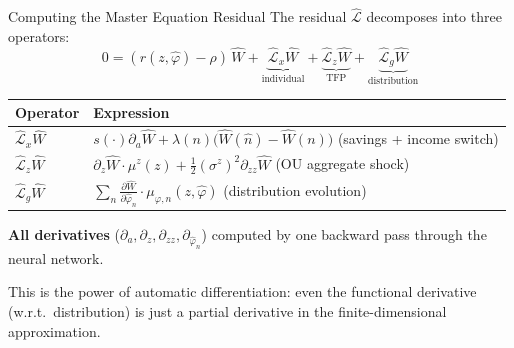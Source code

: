 \documentclass[aspectratio=169,11pt]{beamer}
\newcommand{\emphc}[1]{\textcolor{harvardcrimson}{#1}}
\begin{document}
\begin{frame}{Computing the Master Equation Residual}
\small
The residual $\hat{\mathcal{L}}$ decomposes into three operators:
\[
0 = (r(z,\hat{\varphi}) - \rho)\,\hat{W} + \underbrace{\hat{\mathcal{L}}_x\hat{W}}_{\text{individual}} + \underbrace{\hat{\mathcal{L}}_z\hat{W}}_{\text{TFP}} + \underbrace{\hat{\mathcal{L}}_g\hat{W}}_{\text{distribution}}
\]

\vspace{0.1em}
\begin{center}
\small
\renewcommand{\arraystretch}{1.3}
\begin{tabular}{ll}
\toprule
\textbf{Operator} & \textbf{Expression} \\
\midrule
$\hat{\mathcal{L}}_x\hat{W}$ & $s(\cdot)\partial_a\hat{W} + \lambda(n)\big(\hat{W}(\hat{n}) - \hat{W}(n)\big)$ \quad (savings + income switch) \\
$\hat{\mathcal{L}}_z\hat{W}$ & $\partial_z\hat{W}\cdot\mu^z(z) + \frac{1}{2}(\sigma^z)^2\partial_{zz}\hat{W}$ \quad (OU aggregate shock) \\
$\hat{\mathcal{L}}_g\hat{W}$ & $\sum_n \frac{\partial \hat{W}}{\partial \hat{\varphi}_n}\cdot\mu_{\hat{\varphi},n}(z, \hat{\varphi})$ \quad (distribution evolution) \\
\bottomrule
\end{tabular}
\end{center}

\vspace{0.2em}
\textbf{All derivatives} ($\partial_a, \partial_z, \partial_{zz}, \partial_{\hat{\varphi}_n}$) computed by \emphc{one backward pass} through the neural network.

\vspace{0.2em}
{\small This is the power of automatic differentiation: even the functional derivative (w.r.t.\ distribution) is just a partial derivative in the finite-dimensional approximation.}
\end{frame}
\end{document}
